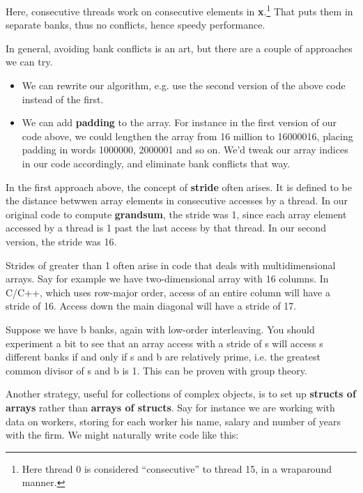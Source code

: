 Here, consecutive threads work on consecutive elements in {\bf
x}.\footnote{Here thread 0 is considered ``consecutive'' to thread 15,
in a wraparound manner.}  That puts them in separate banks, thus no
conflicts, hence speedy performance.

In general, avoiding bank conflicts is an art, but there are a couple
of approaches we can try.

\begin{itemize}

\item We can rewrite our algorithm, e.g. use the second version of the
above code instead of the first.

\item We can add {\bf padding} to the array.  For instance in the first
version of our code above, we could lengthen the array from 16 million
to 16000016, placing padding in words 1000000, 2000001 and so on.  We'd
tweak our array indices in our code accordingly, and eliminate bank
conflicts that way.

\end{itemize}

In the first approach above, the concept of {\bf stride} often arises.
It is defined to be the distance betwwen array elements in consecutive
accesses by a thread.  In our original code to compute {\bf grandsum},
the stride was 1, since each array element accessed by a thread is 1
past the last access by that thread.  In our second version, the stride
was 16.

Strides of greater than 1 often arise in code that deals with
multidimensional arrays.  Say for example we have two-dimensional array
with 16 columns.  In C/C++, which uses row-major order, access of an
entire column will have a stride of 16.  Access down the main diagonal
will have a stride of 17.

Suppose we have b banks, again with low-order interleaving.  You should
experiment a bit to see that an array access with a stride of s will
access s different banks if and only if s and b are relatively prime,
i.e. the greatest common divisor of s and b is 1.  This can be proven
with group theory.

Another strategy, useful for collections of complex objects, is to set
up {\bf structs of arrays} rather than {\bf arrays of structs}.  Say
for instance we are working with data on workers, storing for each
worker his name, salary and number of years with the firm.  We might
naturally write code like this:


